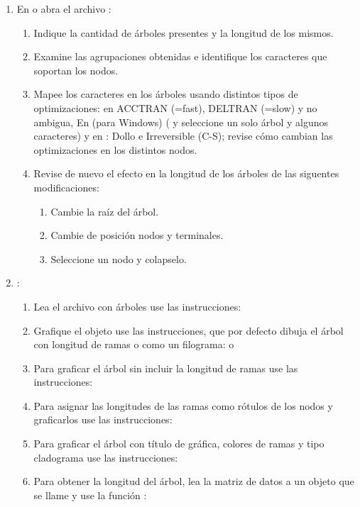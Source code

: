 \begin{enumerate}
	\item En  o  abra el archivo :
	\begin{enumerate}
		\item Indique la cantidad de \'arboles presentes y la longitud de los mismos.
		\item Examine las agrupaciones obtenidas e identifique los caracteres que soportan los nodos.
		\item Mapee los caracteres en los \'arboles usando distintos tipos de optimizaciones: en  ACCTRAN (=fast), DELTRAN (=slow) y no ambigua, En  (para Windows) ( y seleccione un solo \'arbol y algunos caracteres) y en : Dollo e Irreversible (C-S); revise c\'omo cambian las optimizaciones en los distintos nodos.
		\item Revise de nuevo el efecto en la longitud de los \'arboles de las siguentes modificaciones:
		\begin{enumerate}
			\item Cambie la ra\'iz del \'arbol.
			\item Cambie de posici\'on nodos y terminales.
			\item Seleccione un nodo y colapselo.
		\end{enumerate}
	\end{enumerate}

	

	\item \En {}:
	\begin{enumerate}

		\item Lea el archivo con \'arboles  use las instrucciones:
		\item Grafique el objeto  use las instrucciones, que por defecto dibuja el \'arbol con longitud de ramas o como un filograma:
		 o
		\item Para graficar el \'arbol sin incluir la longitud de ramas  use las instrucciones:
		\item Para asignar las longitudes de las ramas como r\'otulos de los nodos y graficarlos use las instrucciones:
		\item Para graficar el \'arbol con t\'itulo de gr\'afica, colores de ramas y tipo cladograma use las instrucciones:
		\item Para obtener la longitud del \'arbol, lea la matriz de datos  a un objeto que se llame  y use la funci\'on :
	\end{enumerate}	



\end{enumerate}
